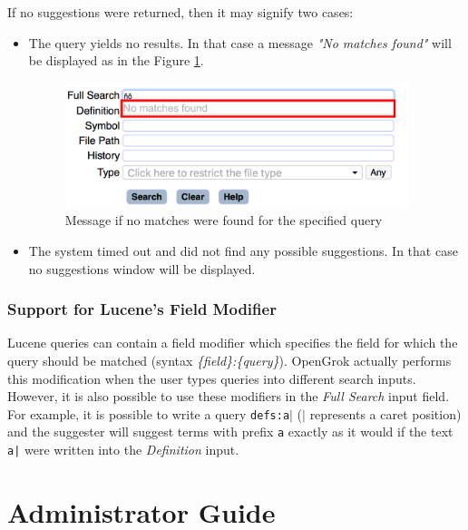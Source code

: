 If no suggestions were returned, then
it may signify two cases:
\begin{itemize}
    \item The query yields no results. In that case a message \textit{"No matches found"} will be displayed as in the
    Figure \ref{no_matches}.
    \begin{figure}[htbp]
        \centering
        \includegraphics[width=100mm]{../img/no_matches.png}
        \caption{Message if no matches were found for the specified query}
        \label{no_matches}
    \end{figure}

    \item The system timed out and did not find any possible suggestions. In that case no suggestions window will be displayed.
\end{itemize}

\subsubsection{Support for Lucene's Field Modifier}
Lucene queries can contain a field modifier which specifies the field for which the query should be matched (syntax \textit{\{field\}:\{query\}}). OpenGrok
actually performs this modification when the user types queries into different search inputs. However, it is also possible
to use these modifiers in the \textit{Full Search} input field. For example, it is possible to write a query
\texttt{defs:a$\vert$} (\texttt{$\vert$} represents a caret position) and the suggester will suggest terms with prefix
\texttt{a} exactly as it would if the text \texttt{a|} were written into the \textit{Definition} input.

\section{Administrator Guide}
\label{administrator_guide}

